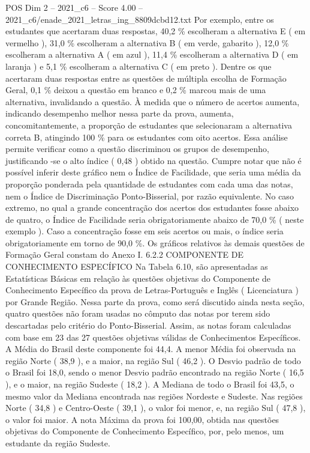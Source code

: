 \begin{textsample}{POS Dim 2 – 2021\_c6 – Score 4.00 – 2021\_c6/enade\_2021\_letras\_ing\_8809dcbd12.txt}
Por exemplo, entre os estudantes que acertaram duas respostas, 40,2 \% escolheram a alternativa E ( em vermelho ), 31,0 \% escolheram a alternativa B ( em verde, gabarito ), 12,0 \% escolheram a alternativa A ( em azul ), 11,4 \% escolheram a alternativa D ( em laranja ) e 5,1 \% escolheram a alternativa C ( em preto ).
Dentre os que acertaram duas respostas entre as questões de múltipla escolha de Formação Geral, 0,1 \% deixou a questão em branco e 0,2 \% marcou mais de uma alternativa, invalidando a questão.
À medida que o número de acertos aumenta, indicando desempenho melhor nessa parte da prova, aumenta, concomitantemente, a proporção de estudantes que selecionaram a alternativa correta B, atingindo 100 \% para os estudantes com oito acertos.
Essa análise permite verificar como a questão discriminou os grupos de desempenho, justificando -se o alto índice ( 0,48 ) obtido na questão.
Cumpre notar que não é possível inferir deste gráfico nem o Índice de Facilidade, que seria uma média da proporção ponderada pela quantidade de estudantes com cada uma das notas, nem o Índice de Discriminação Ponto-Bisserial, por razão equivalente.
No caso extremo, no qual a grande concentração dos acertos dos estudantes fosse abaixo de quatro, o Índice de Facilidade seria obrigatoriamente abaixo de 70,0 \% ( neste exemplo ).
Caso a concentração fosse em seis acertos ou mais, o índice seria obrigatoriamente em torno de 90,0 \%.
Os gráficos relativos às demais questões de Formação Geral constam do Anexo I. 6.2.2 COMPONENTE DE CONHECIMENTO ESPECÍFICO Na Tabela 6.10, são apresentadas as Estatísticas Básicas em relação às questões objetivas do Componente de Conhecimento Específico da prova de Letras-Português e Inglês ( Licenciatura ) por Grande Região.
Nessa parte da prova, como será discutido ainda nesta seção, quatro questões não foram usadas no cômputo das notas por terem sido descartadas pelo critério do Ponto-Bisserial.
Assim, as notas foram calculadas com base em 23 das 27 questões objetivas válidas de Conhecimentos Específicos.
A Média do Brasil deste componente foi 44,4.
A menor Média foi observada na região Norte ( 38,9 ), e a maior, na região Sul ( 46,2 ).
O Desvio padrão de todo o Brasil foi 18,0, sendo o menor Desvio padrão encontrado na região Norte ( 16,5 ), e o maior, na região Sudeste ( 18,2 ).
A Mediana de todo o Brasil foi 43,5, o mesmo valor da Mediana encontrada nas regiões Nordeste e Sudeste.
Nas regiões Norte ( 34,8 ) e Centro-Oeste ( 39,1 ), o valor foi menor, e, na região Sul ( 47,8 ), o valor foi maior.
A nota Máxima da prova foi 100,00, obtida nas questões objetivas do Componente de Conhecimento Específico, por, pelo menos, um estudante da região Sudeste.

\end{textsample}
